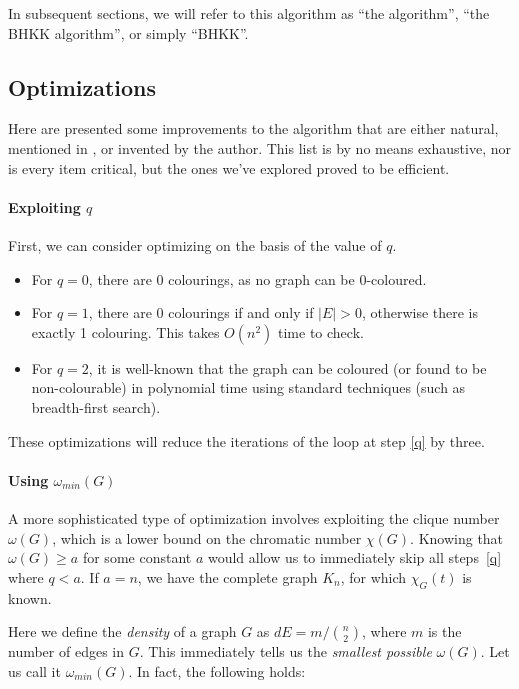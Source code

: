 \documentclass{cslthse-msc}
\begin{document}
In subsequent sections, we will refer to this algorithm as ``the algorithm'', ``the BHKK algorithm'', or simply ``BHKK''.

\subsection{Optimizations}\label{optimizations}
Here are presented some improvements to the algorithm that are either natural, mentioned in \cite{cov_pack}, or invented by the author. This list is by no means exhaustive, nor is every item critical, but the ones we've explored proved to be efficient. 

\paragraph{Exploiting $q$}
First, we can consider optimizing on the basis of the value of $q$.
\begin{itemize}
\item For $q = 0$, there are 0 colourings, as no graph can be 0-coloured.
\item For $q = 1$, there are 0 colourings if and only if $|E| > 0$, otherwise there is exactly 1 colouring. This takes $O(n^2)$ time to check.
\item For $q = 2$, it is well-known that the graph can be coloured (or found to be non-colourable) in polynomial time using standard techniques (such as breadth-first search).
\end{itemize}

These optimizations will reduce the iterations of the loop at step \ref{q} by three.

\paragraph{Using $\omega_{min}(G)$}
A more sophisticated type of optimization involves exploiting the clique number $\omega(G)$, which is a lower bound on the chromatic number $\chi(G)$. Knowing that $\omega(G) \geq a$ for some constant $a$ would allow us to immediately skip all steps~\ref{q} where $q < a$. If $a = n$, we have the complete graph $K_n$, for which $\chi_G(t)$ is known.

Here we define the \emph{density} of a graph $G$ as $dE = m/\binom{n}{2}$, where $m$ is the number of edges in $G$. This immediately tells us the \emph{smallest possible} $\omega(G)$. Let us call it $\omega_{min}(G)$. In fact, the following holds:
\end{document}
